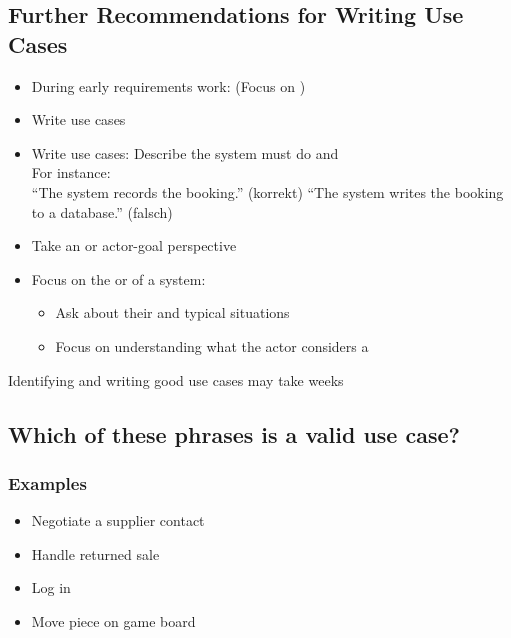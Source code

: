 \subsection{Further Recommendations for Writing Use Cases}
\begin{itemize}
    \item During early requirements work:  (Focus on )
    \item Write  use cases
    \item Write  use cases: Describe  the system must do and \\
    For instance:\\
    \enquote{The system records the booking.} (korrekt)
    \enquote{The system writes the booking to a database.} (falsch)
    \item Take an  or actor-goal perspective
    \item Focus on the  or  of a system:
    \begin{itemize}
        \item Ask about their  and typical situations
        \item Focus on understanding what the actor considers a 
    \end{itemize}
\end{itemize}
\begin{defBox}
    Identifying and writing good use cases may take weeks
\end{defBox}

\subsection{Which of these phrases is a valid use case?}
\subsubsection*{Examples}
\begin{itemize}
    \item Negotiate a supplier contact
    \item Handle returned sale
    \item Log in 
    \item Move piece on game board
\end{itemize}

